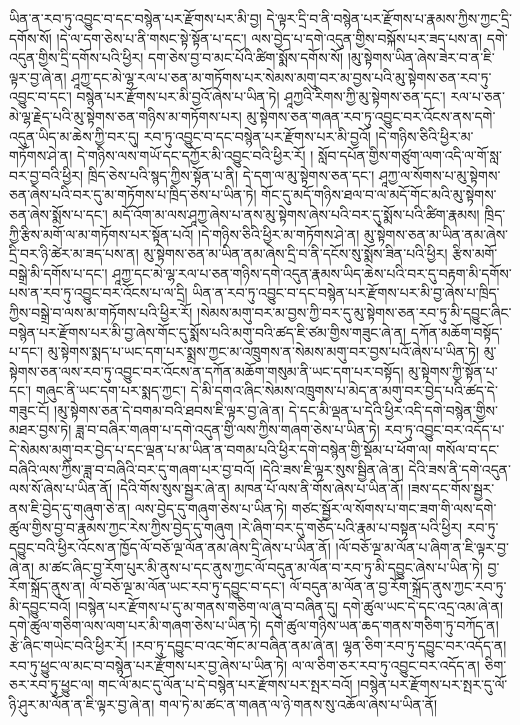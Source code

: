 ཡིན་ན་རབ་ཏུ་འབྱུང་བ་དང་བསྙེན་པར་རྫོགས་པར་མི་བྱ། དེ་ལྟར་དྲི་བ་ནི་བསྙེན་པར་རྫོགས་པ་རྣམས་ཀྱིས་ཀྱང་དྲི་དགོས་སོ། །དེ་ལ་དག་ཅེས་པ་ནི་གསང་སྟེ་སྟོན་པ་དང་། ལས་བྱེད་པ་དགེ་འདུན་གྱིས་བསྐོས་པར་ཟད་པས་ན། དགེ་འདུན་གྱིས་དྲི་དགོས་པའི་ཕྱིར། དག་ཅེས་བྱ་བ་མང་པོའི་ཚིག་སྨོས་དགོས་སོ། །མུ་སྟེགས་ཡིན་ཞེས་ཟེར་བ་ན་ཇི་ལྟར་བྱ་ཞེ་ན། ཤཱཀྱ་དང་མེ་ལྷ་རལ་པ་ཅན་མ་གཏོགས་པར་སེམས་མགུ་བར་མ་བྱས་པའི་མུ་སྟེགས་ཅན་རབ་ཏུ་འབྱུང་བ་དང་། བསྙེན་པར་རྫོགས་པར་མི་བྱའོ་ཞེས་པ་ཡིན་ཏེ། ཤཱཀྱའི་རིགས་ཀྱི་མུ་སྟེགས་ཅན་དང་། རལ་པ་ཅན་མེ་ལྷ་རྗེད་པའི་མུ་སྟེགས་ཅན་གཉིས་མ་གཏོགས་པར། མུ་སྟེགས་ཅན་གཞན་རབ་ཏུ་འབྱུང་བར་འོངས་ནས་དགེ་འདུན་ཡིད་མ་ཆེས་ཀྱི་བར་དུ། རབ་ཏུ་འབྱུང་བ་དང་བསྙེན་པར་རྫོགས་པར་མི་བྱའོ། །དེ་གཉིས་ཅིའི་ཕྱིར་མ་གཏོགས་ཤེ་ན། དེ་གཉིས་ལས་གཡོ་དང་དཀྱོར་མི་འབྱུང་བའི་ཕྱིར་རོ། །
སློབ་དཔོན་གྱིས་གཙུག་ལག་འདི་ལ་གོ་སླ་བར་བྱ་བའི་ཕྱིར། ཁྲིད་ཅེས་པའི་སྙད་ཀྱིས་སྟོན་པ་ནི། དེ་དག་ལ་མུ་སྟེགས་ཅན་དང་། ཤཱཀྱ་ལ་སོགས་པ་མུ་སྟེགས་ཅན་ཞེས་པའི་བར་དུ་མ་གཏོགས་པ་ཁྲིད་ཅེས་པ་ཡིན་ཏེ། གོང་དུ་མདོ་གཉིས་ཐལ་བ་ལ་མདོ་གོང་མའི་མུ་སྟེགས་ཅན་ཞེས་སྨོས་པ་དང་། མདོ་འོག་མ་ལས་ཤཱཀྱ་ཞེས་པ་ནས་མུ་སྟེགས་ཞེས་པའི་བར་དུ་སྨོས་པའི་ཚིག་རྣམས། ཁྲིད་ཀྱི་རྩིས་མགོ་ལ་མ་གཏོགས་པར་སྟོན་པའོ། །དེ་གཉིས་ཅིའི་ཕྱིར་མ་གཏོགས་ཤེ་ན། མུ་སྟེགས་ཅན་མ་ཡིན་ནམ་ཞེས་དྲི་བར་ཉི་ཚེར་མ་ཟད་པས་ན། མུ་སྟེགས་ཅན་མ་ཡིན་ནམ་ཞེས་དྲི་བ་ནི་དངོས་སུ་སྨོས་ཟིན་པའི་ཕྱིར། རྩིས་མགོ་བསྒྲེ་མི་དགོས་པ་དང་། ཤཱཀྱ་དང་མེ་ལྷ་རལ་པ་ཅན་གཉིས་དགེ་འདུན་རྣམས་ཡིད་ཆེས་པའི་བར་དུ་བརྟག་མི་དགོས་པས་ན་རབ་ཏུ་འབྱུང་བར་འོངས་པ་ལ་དྲི། ཡིན་ན་རབ་ཏུ་འབྱུང་བ་དང་བསྙེན་པར་རྫོགས་པར་མི་བྱ་ཞེས་པ་ཁྲིད་ཀྱིས་བསྒྲེ་བ་ལས་མ་གཏོགས་པའི་ཕྱིར་རོ། །སེམས་མགུ་བར་མ་བྱས་ཀྱི་བར་དུ་མུ་སྟེགས་ཅན་རབ་ཏུ་མི་དབྱུང་ཞིང་བསྙེན་པར་རྫོགས་པར་མི་བྱ་ཞེས་གོང་དུ་སྨོས་པའི་མགུ་བའི་ཚད་ཇི་ཙམ་གྱིས་གཟུང་ཞེ་ན། དཀོན་མཆོག་བསྟོད་པ་དང་། མུ་སྟེགས་སྨད་པ་ཡང་དག་པར་སྨྲས་ཀྱང་མ་འཁྲུགས་ན་སེམས་མགུ་བར་བྱས་པའོ་ཞེས་པ་ཡིན་ཏེ། མུ་སྟེགས་ཅན་ལས་རབ་ཏུ་འབྱུང་བར་འོངས་ན་དཀོན་མཆོག་གསུམ་ནི་ཡང་དག་པར་བསྟོད། མུ་སྟེགས་ཀྱི་སྟོན་པ་དང་། གཞུང་ནི་ཡང་དག་པར་སྨད་ཀྱང་། དེ་མི་དགའ་ཞིང་སེམས་འཁྲུགས་པ་མེད་ན་མགུ་བར་བྱེད་པའི་ཚད་དེ་གཟུང་ངོ། །མུ་སྟེགས་ཅན་དེ་བགམ་བའི་ཐབས་ཇི་ལྟར་བྱ་ཞེ་ན། དེ་དང་མི་ལྡན་པ་དེའི་ཕྱིར་འདི་དགེ་བསྙེན་གྱིས་མཐར་བྱས་ཏེ། ཟླ་བ་བཞིར་གཞག་པ་དགེ་འདུན་གྱི་ལས་ཀྱིས་གཞག་ཅེས་པ་ཡིན་ཏེ། རབ་ཏུ་འབྱུང་བར་འདོད་པ་དེ་སེམས་མགུ་བར་བྱེད་པ་དང་ལྡན་པ་མ་ཡིན་ན་བགམ་པའི་ཕྱིར་དགེ་བསྙེན་གྱི་སྡོམ་པ་ཕོག་ལ། གསོལ་བ་དང་བཞིའི་ལས་ཀྱིས་ཟླ་བ་བཞིའི་བར་དུ་གཞག་པར་བྱ་བའོ། །དེའི་ཟས་ཇི་ལྟར་སུས་སྦྱིན་ཞེ་ན། དེའི་ཟས་ནི་དགེ་འདུན་ལས་སོ་ཞེས་པ་ཡིན་ནོ། །དེའི་གོས་སུས་སྦྱར་ཞེ་ན། མཁན་པོ་ལས་ནི་གོས་ཞེས་པ་ཡིན་ནོ། །ཟས་དང་གོས་སྦྱར་ནས་ཇི་བྱེད་དུ་གཞུག་ཅེ་ན། ལས་བྱེད་དུ་གཞུག་ཅེས་པ་ཡིན་ཏེ། གཙང་སྦྱོར་ལ་སོགས་པ་གང་ཟག་གི་ལས་དགེ་ཚུལ་གྱིས་བྱ་བ་རྣམས་ཀྱང་རེས་ཀྱིས་བྱེད་དུ་གཞུག །རེ་ཞིག་བར་དུ་གཅོད་པའི་རྣམ་པ་བསྟན་པའི་ཕྱིར། རབ་ཏུ་དབྱུང་བའི་ཕྱིར་འོངས་ན་ཁྱོད་ལོ་བཅོ་ལྔ་ལོན་ནམ་ཞེས་དྲི་ཞེས་པ་ཡིན་ནོ། །ལོ་བཅོ་ལྔ་མ་ལོན་པ་ཞིག་ན་ཇི་ལྟར་བྱ་ཞེ་ན། མ་ཚང་ཞིང་བྱ་རོག་པུར་མི་ནུས་པ་དང་ནུས་ཀྱང་ལོ་བདུན་མ་ལོན་བ་རབ་ཏུ་མི་དབྱུང་ཞེས་པ་ཡིན་ཏེ། བྱ་རོག་སྐྲོད་ནུས་ན། ལོ་བཅོ་ལྔ་མ་ལོན་ཡང་རབ་ཏུ་དབྱུང་བ་དང་། ལོ་བདུན་མ་ལོན་ན་བྱ་རོག་སྐྲོད་ནུས་ཀྱང་རབ་ཏུ་མི་དབྱུང་བའོ། །བསྙེན་པར་རྫོགས་པ་དུ་མ་གནས་གཅིག་ལ་ཞུ་བ་བཞིན་དུ། དགེ་ཚུལ་ཡང་དེ་དང་འདྲ་འམ་ཞེ་ན། དགེ་ཚུལ་གཅིག་ལས་ལག་པར་མི་གཞག་ཅེས་པ་ཡིན་ཏེ། དགེ་ཚུལ་གཉིས་ཡན་ཆད་གནས་གཅིག་ཏུ་བཀོད་ན། རྩེ་ཞིང་གཡེང་བའི་ཕྱིར་རོ། །རབ་ཏུ་དབྱུང་བ་འང་གོང་མ་བཞིན་ནམ་ཞེ་ན། ལྷན་ཅིག་རབ་ཏུ་དབྱུང་བར་འདོད་ན། རབ་ཏུ་ཕྱུང་ལ་མང་བ་བསྙེན་པར་རྫོགས་པར་བྱ་ཞེས་པ་ཡིན་ཏེ། ལ་ལ་ཅིག་ཅར་རབ་ཏུ་འབྱུང་བར་འདོད་ན། ཅིག་ཅར་རབ་ཏུ་ཕྱུང་ལ། གང་ལོ་མང་དུ་ལོན་པ་དེ་བསྙེན་པར་རྫོགས་པར་སྤར་བའོ། །བསྙེན་པར་རྫོགས་པར་སྤར་དུ་ལོ་ཉི་ཤུར་མ་ལོན་ན་ཇི་ལྟར་བྱ་ཞེ་ན། གལ་ཏེ་མ་ཚང་ན་གཞན་ལ་ཉེ་གནས་སུ་འཆོལ་ཞེས་པ་ཡིན་ནོ། 